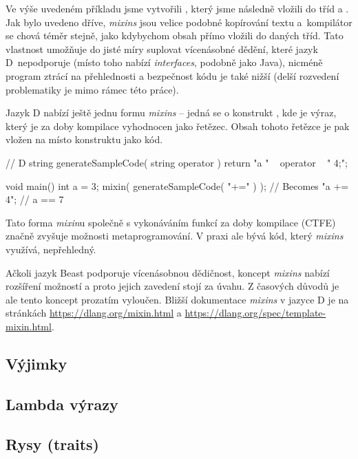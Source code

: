 Ve výše uvedeném příkladu jsme vytvořili , který jsme následně vložili do tříd  a . Jak bylo uvedeno dříve, \textit{mixins} jsou velice podobné kopírování textu a~kompilátor se chová téměr stejně, jako kdybychom obsah  přímo vložili do daných tříd. Tato vlastnost umožňuje do jisté míry suplovat vícenásobné dědění, které jazyk D~nepodporuje (místo toho nabízí \textit{interfaces}, podobně jako Java), nicméně program ztrácí na přehlednosti a bezpečnost kódu je také nižší (delší rozvedení problematiky je mimo rámec této práce).

Jazyk D nabízí ještě jednu formu \textit{mixins} -- jedná se o konstrukt , kde  je výraz, který je za doby kompilace vyhodnocen jako řetězec. Obsah tohoto řetězce je pak vložen na místo konstruktu jako kód.

\begin{dcode}
// D
string generateSampleCode( string operator ) {
	return "a " ~ operator ~ " 4;";	
}

void main() {
	int a = 3;
	mixin( generateSampleCode( "+=" ) ); // Becomes "a += 4";
	// a == 7
}
\end{dcode}

Tato forma \textit{mixin}u společně s vykonáváním funkcí za doby kompilace (CTFE) značně zvyšuje možnosti metaprogramování. V praxi ale bývá kód, který \textit{mixins} využívá, nepřehledný.

Ačkoli jazyk Beast podporuje vícenásobnou dědičnost, koncept \textit{mixins} nabízí rozšíření možností a proto jejich zavedení stojí za úvahu. Z časových důvodů je ale tento koncept prozatím vyloučen. Bližší dokumentace \textit{mixins} v jazyce D je na stránkách \url{https://dlang.org/mixin.html} a \url{https://dlang.org/spec/template-mixin.html}.

\subsection{Výjimky}

\subsection{Lambda výrazy}

\subsection{Rysy (traits)}

